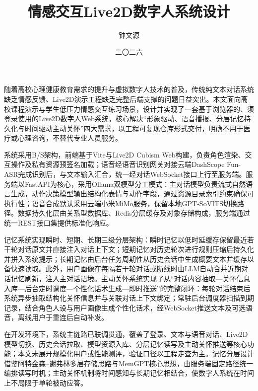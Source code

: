 \documentclass{base}
\title{情感交互Live2D数字人系统设计}
\author{钟文源}
\date{二〇二六}{六}{2026}
\begin{document}
\maketitle
\tableofcontents

\begin{cnabstract}
随着高校心理健康教育需求的提升与虚拟数字人技术的普及，传统纯文本对话系统缺乏情感反馈、Live2D演示工程缺乏完整后端支撑的问题日益突出。本文面向高校课程演示与学生低压力情感交互练习场景，设计并实现了一套基于浏览器的、须登录使用的Live2D数字人Web系统，核心解决``形象驱动、语音播报、分层记忆持久化与时间驱动主动关怀''四大需求，以工程可复现仓库形式交付，明确不用于医疗或心理咨询，不替代专业人员服务。

系统采用B/S架构，前端基于Vite与Live2D Cubism Web构建，负责角色渲染、交互操作及私有资源预签名加载；语音经语音识别网关对接云端DashScope Fun-ASR完成识别后，与文本输入汇合，统一经对话WebSocket接口上行至服务端。服务端以FastAPI为核心，采用Ollama双模型分工模式：主对话模型负责流式自然语言生成，动作决策模型输出结构化表情与动作字段，通过资源目录索引约束确保可执行性；语音合成默认采用云端小米MiMo服务，保留本地GPT-SoVITS切换路径。数据持久化层由关系型数据库、Redis分层缓存及对象存储构成，服务端通过统一REST接口集提供标准化响应。

记忆系统实现瞬时、短期、长期三级分层架构：瞬时记忆以低时延缓存保留最近若干轮对话原文并直接注入对话上下文；短期记忆对历史轮次进行规则压缩后持久化并拼入系统提示；长期记忆由后台任务周期性从历史会话中生成概要文本并缓存以备快速读取。此外，用户画像在每隔若干轮对话或断线时由LLM自动合并近期对话记忆刷新，注入主对话语境。主动关怀系统实现了从``对话内容抽取—关怀信息入库—后台定时调度—个性化话术生成—即时推送''的完整闭环：每轮对话结束后系统异步抽取结构化关怀信息并与关联对话上下文绑定；常驻后台调度器扫描到期记录，结合角色人设与用户画像生成个性化话术，经WebSocket推送文本及可选语音，离线用户于重连后自动补发。

在开发环境下，系统主链路已联调贯通，覆盖了登录、文本与语音对话、Live2D模型切换、历史会话拉取、模型资源入库、分层记忆读写及主动关怀推送等核心功能；本文未展开规模化用户或性能测评，验证口径以工程走查为主。记忆分层设计借鉴阿特金森--谢弗林多层存储思路与MemGPT核心思想，由服务端固定路径统一编排读写时机；主动关怀机制将时间感知与长期记忆相结合，使数字人系统在时间上不局限于单轮被动应答。

\end{cnabstract}
\end{document}
